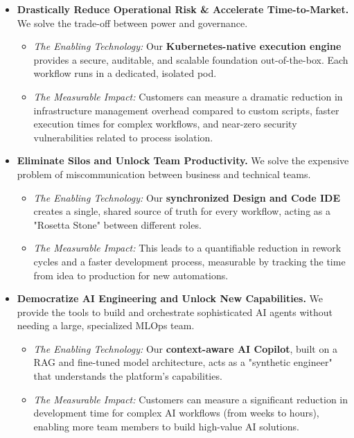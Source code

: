 \begin{itemize}
    \item \textbf{Drastically Reduce Operational Risk \& Accelerate Time-to-Market.} We solve the trade-off between power and governance.
    \begin{itemize}
        \item \textit{The Enabling Technology:} Our \textbf{Kubernetes-native execution engine} provides a secure, auditable, and scalable foundation out-of-the-box. Each workflow runs in a dedicated, isolated pod.
        \item \textit{The Measurable Impact:} Customers can measure a dramatic reduction in infrastructure management overhead compared to custom scripts, faster execution times for complex workflows, and near-zero security vulnerabilities related to process isolation.
    \end{itemize}

    \item \textbf{Eliminate Silos and Unlock Team Productivity.} We solve the expensive problem of miscommunication between business and technical teams.
    \begin{itemize}
        \item \textit{The Enabling Technology:} Our \textbf{synchronized Design and Code IDE} creates a single, shared source of truth for every workflow, acting as a "Rosetta Stone" between different roles.
        \item \textit{The Measurable Impact:} This leads to a quantifiable reduction in rework cycles and a faster development process, measurable by tracking the time from idea to production for new automations.
    \end{itemize}

    \item \textbf{Democratize AI Engineering and Unlock New Capabilities.} We provide the tools to build and orchestrate sophisticated AI agents without needing a large, specialized MLOps team.
    \begin{itemize}
        \item \textit{The Enabling Technology:} Our \textbf{context-aware AI Copilot}, built on a RAG and fine-tuned model architecture, acts as a "synthetic engineer" that understands the platform's capabilities.
        \item \textit{The Measurable Impact:} Customers can measure a significant reduction in development time for complex AI workflows (from weeks to hours), enabling more team members to build high-value AI solutions.
    \end{itemize}
    

\end{itemize}
